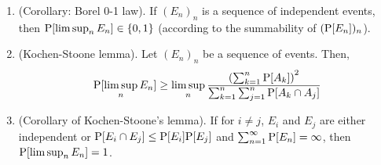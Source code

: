 \documentclass[a4paper,10pt]{article}
\begin{document}
\begin{enumerate}
 \item (Corollary: Borel 0-1 law). If $(E_n)_n$ is a sequence of independent events, 
       then $\mathrm{P}[\limsup_n E_n]\in\{0,1\}$ (according to the summability of $(\mathrm{P}[E_n])_n$).

 \item (Kochen-Stoone lemma). Let $(E_n)_n$ be a sequence of events. Then,
 \[
  \mathrm{P}[\limsup_n E_n] \geq \limsup_n \frac{\left(\sum_{k=1}^n \mathrm{P}[A_k]\right)^2}{\sum_{k=1}^{n}\sum_{j=1}^{n}\mathrm{P}[A_k\cap A_j]}
 \]
 
 \item (Corollary of Kochen-Stoone's lemma). If for $i\neq j$, $E_i$ and $E_j$ are either independent 
       or $\mathrm{P}[E_i\cap E_j] \leq \mathrm{P}[E_i]\mathrm{P}[E_j]$ and $\sum_{n=1}^{\infty}\mathrm{P}[E_n]=\infty$,
       then $\mathrm{P}[\limsup_n E_n] = 1$.

\end{enumerate}
\end{document}
